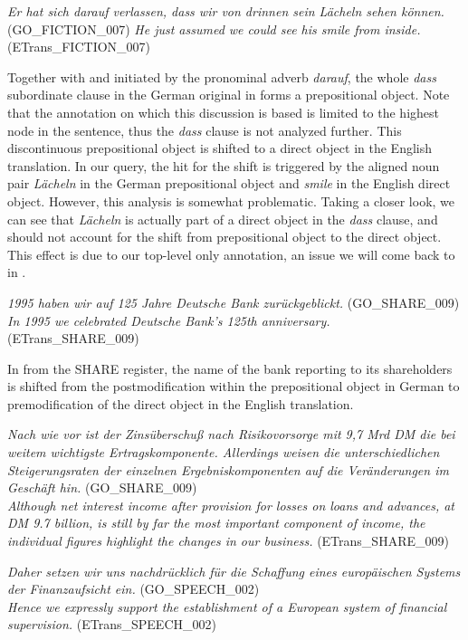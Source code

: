 \documentclass[output=paper]{LSP/langsci}
\begin{document}
\ea \label{ex:culo:19}
    \ea\label{ex:culo:verlassen} \textit{Er hat sich darauf verlassen, dass wir von drinnen sein Lächeln sehen können. }(GO\_FICTION\_007) 
    \ex \textit{He just assumed we could see his smile from inside.} (ETrans\_FICTION\_007) 
    \z
\z

Together with and initiated by the pronominal adverb \textit{darauf}, the whole \textit{dass }subordinate clause in the German original in  forms a prepositional object. Note that the annotation on which this discussion is based is limited to the highest node in the sentence, thus the \textit{dass} clause is not analyzed further. This discontinuous prepositional object is shifted to a direct object in the English translation. In our query, the hit for the shift is triggered by the aligned noun pair \textit{Lächeln} in the German prepositional object and \textit{smile} in the English direct object. However, this analysis is somewhat problematic. Taking a closer look, we can see that \textit{Lächeln} is actually part of a direct object in the \textit{dass} clause, and should not account for the shift from prepositional object to the direct object. This effect is due to our top-level only annotation, an issue we will come back to in .

\ea \label{ex:culo:20}
    \ea \textit{1995 haben wir auf 125 Jahre Deutsche Bank zurückgeblickt.} (GO\_SHARE\_009)\\
     \ex \textit{In 1995 we celebrated Deutsche Bank's 125th anniversary.} (ETrans\_SHARE\_009) 
     \z
\z
 
In  from the SHARE register, the name of the bank reporting to its shareholders is shifted from the postmodification within the prepositional object in German to premodification of the direct object in the English translation. 

\ea \label{ex:culo:21}
  \ea \textit{Nach wie vor ist der Zinsüberschuß nach Risikovorsorge mit 9,7 Mrd DM die bei   weitem wichtigste Ertragskomponente. Allerdings weisen die unterschiedlichen   Steigerungsraten der einzelnen Ergebniskomponenten auf die Veränderungen im Geschäft hin. } (GO\_SHARE\_009)\\
   \ex \textit{Although net interest income after provision for losses on loans and advances, at DM 9.7 billion, is still by far the most important component of income, the individual figures highlight the changes in our business.} (ETrans\_SHARE\_009) 
   \z
\z


\ea \label{ex:culo:22}
   \ea \textit{Daher setzen wir uns nachdrücklich für die Schaffung eines europäischen Systems der Finanzaufsicht ein.} (GO\_SPEECH\_002) \\
    \ex \textit{Hence we expressly support the establishment of a European system of financial   supervision.} (ETrans\_SPEECH\_002) 
    \z
\z
\end{document}
